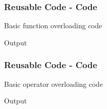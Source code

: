 \begin{frame}\frametitle{Reusable Code - Code}
Basic function overloading code


Output

\end{frame}

\begin{frame}\frametitle{Reusable Code - Code}
Basic operator overloading code


Output

\end{frame}
